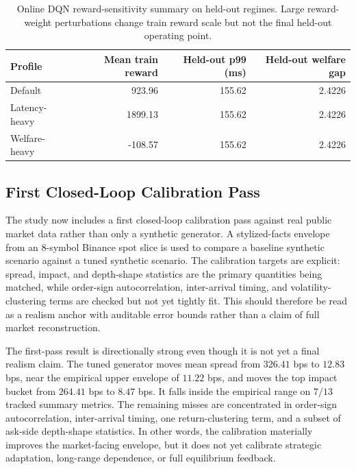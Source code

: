 \documentclass[11pt]{article}
\begin{document}
\begin{table}[t]
\centering
\begin{tabular}{lrrr}
\toprule
Profile & Mean train reward & Held-out p99 (ms) & Held-out welfare gap \\
\midrule
Default & 923.96 & 155.62 & 2.4226 \\
Latency-heavy & 1899.13 & 155.62 & 2.4226 \\
Welfare-heavy & -108.57 & 155.62 & 2.4226 \\
\bottomrule
\end{tabular}
\caption{Online DQN reward-sensitivity summary on held-out regimes. Large reward-weight perturbations change train reward scale but not the final held-out operating point.}
\end{table}

\subsection{First Closed-Loop Calibration Pass}
The study now includes a first closed-loop calibration pass against real public market data rather than only a synthetic generator. A stylized-facts envelope from an 8-symbol Binance spot slice is used to compare a baseline synthetic scenario against a tuned synthetic scenario. The calibration targets are explicit: spread, impact, and depth-shape statistics are the primary quantities being matched, while order-sign autocorrelation, inter-arrival timing, and volatility-clustering terms are checked but not yet tightly fit. This should therefore be read as a realism anchor with auditable error bounds rather than a claim of full market reconstruction.

The first-pass result is directionally strong even though it is not yet a final realism claim. The tuned generator moves mean spread from $326.41$ bps to $12.83$ bps, near the empirical upper envelope of $11.22$ bps, and moves the top impact bucket from $264.41$ bps to $8.47$ bps. It falls inside the empirical range on $7/13$ tracked summary metrics. The remaining misses are concentrated in order-sign autocorrelation, inter-arrival timing, one return-clustering term, and a subset of ask-side depth-shape statistics. In other words, the calibration materially improves the market-facing envelope, but it does not yet calibrate strategic adaptation, long-range dependence, or full equilibrium feedback.
\end{document}
